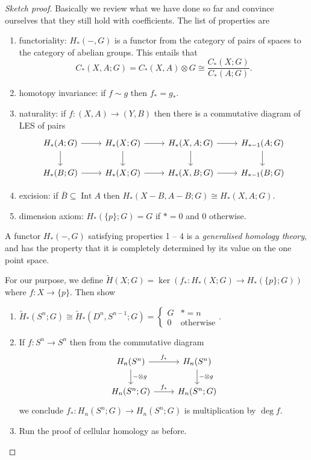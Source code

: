 \documentclass[a4paper]{article}
\DeclareMathOperator{\Int}{Int} %
\begin{document}
\begin{proof}[Sketch proof]
  Basically we review what we have done so far and convince ourselves that they still hold with coefficients. The list of properties are
  \begin{enumerate}
  \item functoriality: \(H_*(-, G)\) is a functor from the category of pairs of spaces to the category of abelian groups. This entails that
    \[
      C_*(X, A; G) = C_*(X, A) \otimes G \cong \frac{C_*(X; G)}{C_*(A; G)}.
    \]
  \item homotopy invariance: if \(f \sim g\) then \(f_* = g_*\).
  \item naturality: if \(f: (X, A) \to (Y, B)\) then there is a commutative diagram of LES of pairs
    \[
      \begin{tikzcd}
        H_*(A; G) \ar[r] \ar[d] & H_*(X; G) \ar[r] \ar[d] & H_*(X, A; G) \ar[r] \ar[d] & H_{* - 1}(A; G) \ar[d] \\
        H_*(B; G) \ar[r] & H_*(X; G) \ar[r] & H_*(X, B; G) \ar[r] & H_{* - 1}(B; G)
      \end{tikzcd}
    \]
  \item excision: if \(\overline B \subseteq \Int A\) then \(H_*(X - B, A - B; G) \cong H_*(X, A; G)\).
  \item dimension axiom: \(H_*(\{p\}; G) = G\) if \(* = 0\) and \(0\) otherwise.
  \end{enumerate}
  A functor \(H_*(-, G)\) satisfying properties 1 -- 4 is a \emph{generalised homology theory}, and has the property that it is completely determined by its value on the one point space.

  For our purpose, we define \(\widetilde H(X; G) = \ker(f_*: H_*(X; G) \to H_*(\{p\}; G))\) where \(f: X \to \{p\}\). Then show
  \begin{enumerate}
  \item \(\widetilde H_*(S^n; G) \cong \widetilde H_*(D^n, S^{n - 1}; G) =
    \begin{cases}
      G & * = n \\
      0 & \text{otherwise}
    \end{cases}
    \).
  \item If \(f: S^n \to S^n\) then from the commutative diagram
    \[
      \begin{tikzcd}
        H_n(S^n) \ar[r, "f_*"] \ar[d, "- \otimes g"] & H_n(S^n) \ar[d, "- \otimes g"] \\
        H_n(S^n; G) \ar[r, "f_*"] & H_n(S^n; G)
      \end{tikzcd}
    \]
    we conclude \(f_*: H_n(S^n; G) \to H_n(S^n; G)\) is multiplication by \(\deg f\).
  \item Run the proof of cellular homology as before.
  \end{enumerate}
\end{proof}
\end{document}
